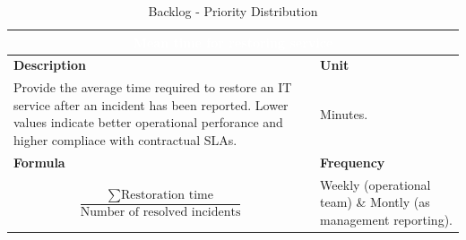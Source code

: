 \begin{table}[H]
    \centering
    \renewcommand{\arraystretch}{1.6}
    \setlength{\arrayrulewidth}{0.6pt}

    \begin{tabularx}{\textwidth}{|X|X|}
    \hline
    \multicolumn{2}{|c|}{\cellcolor{mcblue}\textcolor{white}{\textbf{Mean time for restoring service}}} \\ \hline

    \rowcolor{mclightgray}
    \textbf{Description} & \textbf{Unit} \\ \hline
    Provide the average time required to restore an IT service after an incident has been reported. Lower values indicate better operational perforance and higher compliace with contractual SLAs.
     &
    Minutes. \\ \hline

    \rowcolor{mclightgray}
    \textbf{Formula} & \textbf{Frequency} \\ \hline
    \[
     \frac{\sum{\text{Restoration time}}}{\text{Number of resolved incidents}}
    \]
    
     &
    Weekly (operational team) \& Montly (as management reporting). \\ \hline

    \end{tabularx}

    \caption{Backlog - Priority Distribution}
    \label{tab:measurement_meanTimeRestoringService}
\end{table}





